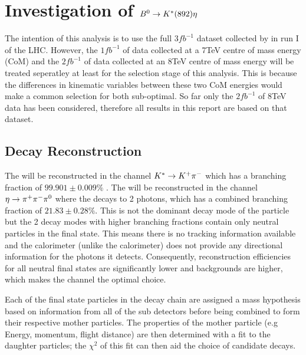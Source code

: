
\section{Investigation of ${{B}^0} \rightarrow {\ensuremath{{K}^*}}(892) \eta$}
\label{sec:Analysis}


The intention of this analysis is to use the full $3fb^{-1}$ dataset collected by \lhcb in run I of the LHC.  However, the $1fb^{-1}$ of data collected at a 7TeV centre of mass energy (CoM) and the $2fb^{-1}$ of data collected at an 8TeV centre of mass energy will be treated seperatley at least for the selection stage of this analysis.  This is because the differences in kinematic variables between these two CoM energies would make a common selection for both sub-optimal. So far only the $2fb^{-1}$ of 8TeV data has been considered, therefore all results in this report are based on that dataset.
\subsection{Decay Reconstruction}
\label{sec:Decay Reconstruction}
The \Kstar will be reconstructed in the channel ${{K}^*} \rightarrow {\ensuremath{{K}^+}}{\ensuremath{{\pi}^-}}$ which has a branching fraction of $99.901\pm0.009\%$ \cite{PDG2014}.  The \etaz will be reconstructed in the channel $\eta \rightarrow {\ensuremath{{\pi}^+}}{\ensuremath{{\pi}^-}}{\ensuremath{{\pi}^0}}$ where the \piz decays to 2 photons, which has a combined branching fraction of $21.83\pm0.28\%$\cite{PDG2014}.  This is not the dominant decay mode of the \etaz particle but the 2 decay modes with higher branching fractions contain only neutral particles in the final state.  This means there is no tracking information available and the \lhcb calorimeter (unlike the \atlas calorimeter) does not provide any directional information for the photons it detects.  Consequently, reconstruction efficiencies for all neutral final states are significantly lower and backgrounds are higher, which makes the \pip\pim\piz channel the optimal choice.  


Each of the final state particles in the decay chain are assigned a mass hypothesis based on information from all of the \lhcb sub detectors before being combined to form their respective mother particles.  The properties of the mother particle (e.g Energy, momentum, flight distance) are then determined with a fit to the daughter particles;   the $\chi^2$ of this fit can then aid the choice of candidate decays.

